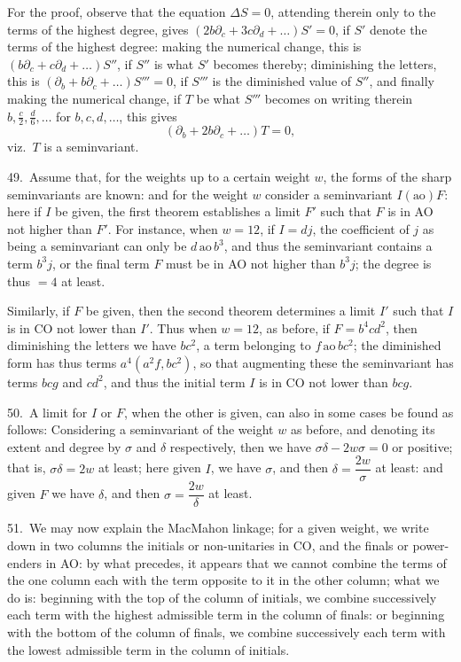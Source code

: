 \documentclass[11pt]{article}
\begin{document}
For the proof, observe that the equation $\Delta S = 0$, attending therein only to the terms of the highest degree, gives $(2b\partial_c + 3c\partial_d + \ldots) S' = 0$, if $S'$ denote the terms of the highest degree: making the numerical change, this is $(b\partial_c + c\partial_d + \ldots) S''$, if $S''$ is what $S'$ becomes thereby; diminishing the letters, this is $(\partial_b + b\partial_c + \ldots) S''' = 0$, if $S'''$
is the diminished value of $S''$, and finally making the numerical change, if $T$ be what $S'''$ becomes on writing therein $b, \tfrac{c}{2}, \tfrac{d}{6}, \ldots$ for $b, c, d, \ldots$, this gives
\[
(\partial_b + 2b\partial_c + \ldots) T = 0,
\]
viz.\ $T$ is a seminvariant.

49.\ Assume that, for the weights up to a certain weight $w$, the forms of the sharp seminvariants are known: and for the weight $w$ consider a seminvariant $I(\text{ao}) F$: here if $I$ be given, the first theorem establishes a limit $F'$ such that $F$ is in AO not higher than $F'$. For instance, when $w = 12$, if $I = dj$, the coefficient of $j$ as being a seminvariant can only be $d\,\mathrm{ao}\,b^3$, and thus the seminvariant contains a term $b^3 j$, or the final term $F$ must be in AO not higher than $b^3 j$; the degree is thus $= 4$ at least.

Similarly, if $F$ be given, then the second theorem determines a limit $I'$ such that $I$ is in CO not lower than $I'$. Thus when $w = 12$, as before, if $F = b^4 c d^2$, then diminishing the letters we have $bc^2$, a term belonging to $f\,\mathrm{ao}\,bc^2$; the diminished form has thus terms $a^4(a^2 f, bc^2)$, so that augmenting these the seminvariant has terms $bcg$ and $cd^2$, and thus the initial term $I$ is in CO not lower than $bcg$.

50.\ A limit for $I$ or $F$, when the other is given, can also in some cases be found as follows: Considering a seminvariant of the weight $w$ as before, and denoting its extent and degree by $\sigma$ and $\delta$ respectively, then we have $\sigma\delta - 2w\sigma = 0$ or positive; that is, $\sigma\delta = 2w$ at least; here given $I$, we have $\sigma$, and then $\delta = \dfrac{2w}{\sigma}$ at least: and given $F$ we have $\delta$, and then $\sigma = \dfrac{2w}{\delta}$ at least.

51.\ We may now explain the MacMahon linkage; for a given weight, we write down in two columns the initials or non-unitaries in CO, and the finals or power-enders in AO: by what precedes, it appears that we cannot combine the terms of the one column each with the term opposite to it in the other column; what we do is: beginning with the top of the column of initials, we combine successively each term with the highest admissible term in the column of finals: or beginning with the bottom of the column of finals, we combine successively each term with the lowest admissible term in the column of initials.
\end{document}
